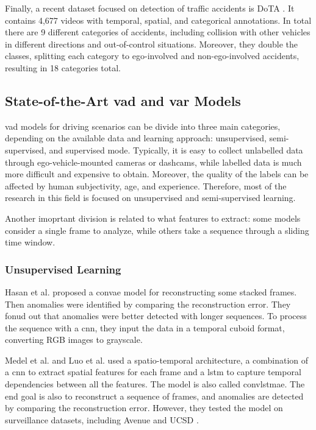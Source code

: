 Finally, a recent dataset focused on detection of traffic accidents is DoTA 
\cite{dota_dataset}. It contains 4,677 videos with temporal, spatial, and 
categorical annotations. In total there are 9 different categories of accidents,
including collision with other vehicles in different directions and out-of-control 
situations. Moreover, they double the classes, splitting each category to 
ego-involved and non-ego-involved accidents, resulting in 18 categories total.

\subsection{State-of-the-Art \acs{vad} and \acs{var} Models}
\acl{vad} models for driving scenarios can be divide into three main categories, 
depending on the available data and learning approach: 
unsupervised, semi-supervised, and supervised mode.
Typically, it is easy to collect unlabelled data through ego-vehicle-mounted 
cameras or dashcams, while labelled data is much more difficult and expensive 
to obtain. Moreover, the quality of the labels can be affected by human 
subjectivity, age, and experience. Therefore, most of the research in this 
field is focused on unsupervised and semi-supervised learning.

Another imoprtant division is related to what features to extract: some models 
consider a single frame to analyze, while others take a sequence through a 
sliding time window. 

\subsubsection{Unsupervised Learning}
Hasan et al. \cite{hasan_convae} proposed a \ac{convae} model for reconstructing 
some stacked frames. Then anomalies were identified by comparing the 
reconstruction error. They fonud out that anomalies were better detected with 
longer sequences. To process the sequence with a \ac{cnn}, they input the data 
in a temporal cuboid format, converting RGB images to grayscale.

Medel et al. \cite{medel_lstmconvae} and Luo et al. \cite{luo_lstmconvae}
 used a spatio-temporal architecture, a 
combination of a \ac{cnn} to extract spatial features for each frame and a 
\ac{lstm} to capture temporal dependencies between all the features. 
The model is also called \ac{convlstmae}.
The end 
goal is also to reconstruct a sequence of frames, and anomalies are detected 
by comparing the reconstruction error. However, they tested the model on 
surveillance datasets, including Avenue \cite{a3d} and UCSD \cite{ucsd}.

